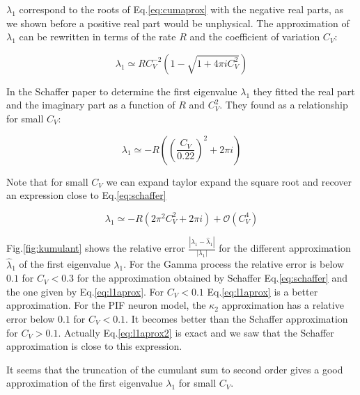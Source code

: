 \documentclass[12pt,twoside]{report}
\begin{document}
$\lambda_1$ correspond to the roots of Eq.\eqref{eq:cumaprox} with the negative real parts, as we shown before a positive real part would be unphysical. The approximation of $\lambda_1$ can be rewritten in terms of the rate $R$ and the coefficient of variation $C_V$: 

\begin{equation}
\label{eq:l1aprox}
\lambda_1\simeq RC_V^{-2}\left( 1-\sqrt{1+4\pi i C_V^2}\right)
\end{equation}

In the Schaffer paper to determine the first eigenvalue $\lambda_1$ they fitted the real part and the imaginary part as a function of $R$ and $C_V^2$. They found as a relationship for small $C_V$:

\begin{equation}
\label{eq:schaffer}
\lambda_1 \simeq -R\left( (\frac{C_V}{0.22})^2+2\pi i\right) 
\end{equation}

Note that for small $C_V$ we can expand taylor expand the square root and recover an expression close to Eq.\eqref{eq:schaffer}

\begin{equation}
\label{eq:l1aprox2}
\lambda_1\simeq -R\left(2\pi^2 C_V^2+2\pi i\right) + \mathcal{O}(C_V^4)
\end{equation}

Fig.\ref{fig:kumulant} shows the relative error $\frac{|\lambda_1 -\hat{\lambda}_1|}{|\lambda_1|}$ for the different approximation $\hat{\lambda}_1$ of the first eigenvalue $\lambda_1$. For the Gamma process the relative error is below $0.1$ for $C_V<0.3$ for the approximation obtained by Schaffer Eq.\eqref{eq:schaffer} and the one given by Eq.\eqref{eq:l1aprox}. For $C_V<0.1$ Eq.\eqref{eq:l1aprox} is a better approximation. For
the PIF neuron model, the $\kappa_2$ approximation has a relative error below $0.1$ for $C_V<0.1$. It becomes better than the Schaffer approximation for $C_V>0.1$. Actually Eq.\eqref{eq:l1aprox2} is exact and we saw that the Schaffer approximation is close to this expression.

It seems that the truncation of the cumulant sum to second order gives a good approximation of the first eigenvalue $\lambda_1$ for small $C_V$.
\end{document}
